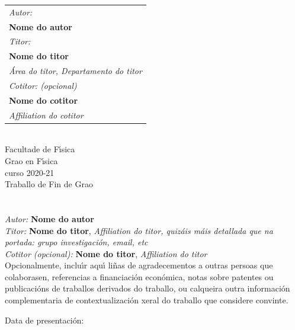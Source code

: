 \begin{tabular}{l}
{\sl\large Autor:} \\
{\bf\Large Nome do autor} %
\vspace{1em}\mbox{} \\
%
{\sl\large Titor:} \\
{\bf\large Nome do titor} \\
{\sl\large \'Area do titor, Departamento do titor}
\vspace{1em}\mbox{} \\
%
{\sl\large Cotitor: (opcional)} \\
{\bf\large Nome do cotitor} \\
{\sl\large Affiliation do cotitor}
\end{tabular}



\mbox{}
\mbox{}\hfill{\large \DataDefensa} \vspace{1cm}




\clearpage
\mbox{}
\clearpage %

\mbox{}\\
Facultade de F\'{\i}sica\\
Grao en F\'{\i}sica \\  
curso 2020-21\\%
{\sc Traballo de Fin de Grao}\vspace{3cm}\\
%
{\sc\LARGE \TituloDoTraballo}\vspace{1cm}\\
{\sl\large \EspecialidadeMaster}\vspace{2cm}\\
%
{\sl Autor:} {\bf Nome do autor}\\ %
{\sl Titor:} {\bf Nome do titor}, {\sl Affiliation do titor, quiz\'ais m\'ais detallada que na portada: grupo investigaci\'on, email, etc}\\
{\sl Cotitor (opcional):} {\bf Nome do titor}, {\sl Affiliation do titor}\vspace{1cm}\\
%
Opcionalmente, inclu\'{\i}r aqu\'{\i}  li\~nas de agradecementos a outras persoas que colaborasen, referencias a financiaci\'on econ\'omica, notas sobre patentes ou publicaci\'ons de traballos derivados do traballo, ou calqueira outra informaci\'on complementaria de contextualizaci\'on xeral do traballo que considere convinte.

\mbox{}

\mbox{}\hfill{Data de presentaci\'on: \DataDefensa}


\clearpage




